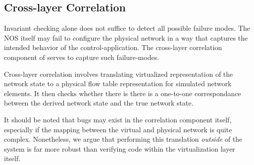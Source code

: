 \subsection{Cross-layer Correlation}
\label{sec:cross_layer_correlation}

Invariant checking alone does not suffice to detect all possible failure
modes. The NOS itself may fail to configure the physical network in a way that
captures the intended behavior of the control-application. The cross-layer correlation
component of \projectname{} serves to capture such failure-modes. 

Cross-layer correlation involves translating
virtualized representation of the network state to a physical flow table
representation for simulated network elements. It then checks whether there is
there is a one-to-one correspondance between the derived network
state and the true network state.

It should be noted that bugs may exist in the correlation component itself,
especially if the mapping between the virtual and physical network is quite
complex. Nonetheless, we argue that performing this
translation {\it outside} of the system is far more robust than verifying code within the
virtualization layer itself.


